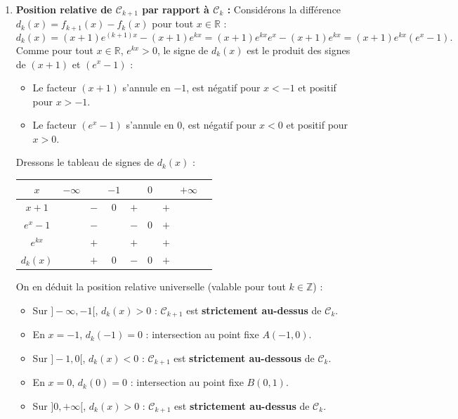 \documentclass[11pt,a4paper]{article}
\newcommand{\Z}{\mathbb{Z}}
\newcommand{\R}{\mathbb{R}}
\begin{document}
\begin{correctionbox}[Exercice 8]
\begin{enumerate}[label=\textbf{\arabic*.}]
    \item \textbf{Position relative de $\mathcal{C}_{k+1}$ par rapport à $\mathcal{C}_k$ :}
    Considérons la différence $d_k(x) = f_{k+1}(x) - f_k(x)$ pour tout $x \in \R$ :
    \[
    d_k(x) = (x+1)e^{(k+1)x} - (x+1)e^{kx} = (x+1)e^{kx}e^x - (x+1)e^{kx} = (x+1)e^{kx}(e^x - 1).
    \]
    Comme pour tout $x \in \R$, $e^{kx} > 0$, le signe de $d_k(x)$ est le produit des signes de $(x+1)$ et $(e^x - 1)$ :
    \begin{itemize}
        \item Le facteur $(x+1)$ s'annule en $-1$, est négatif pour $x < -1$ et positif pour $x > -1$.
        \item Le facteur $(e^x - 1)$ s'annule en $0$, est négatif pour $x < 0$ et positif pour $x > 0$.
    \end{itemize}
    Dressons le tableau de signes de $d_k(x)$ :
    \begin{center}
    \begin{tabular}{|c|lccccccr|}
    \hline
    $x$ & $-\infty$ & & $-1$ & & $0$ & & $+\infty$ \\
    \hline
    $x + 1$ & & $-$ & $0$ & $+$ & \vline & $+$ & \\
    \hline
    $e^x - 1$ & & $-$ & \vline & $-$ & $0$ & $+$ & \\
    \hline
    $e^{kx}$ & & $+$ & \vline & $+$ & \vline & $+$ & \\
    \hline
    $d_k(x)$ & & $+$ & $0$ & $-$ & $0$ & $+$ & \\
    \hline
    \end{tabular}
    \end{center}
    On en déduit la position relative universelle (valable pour tout $k \in \Z$) :
    \begin{itemize}
        \item Sur $]-\infty, -1[$, $d_k(x) > 0$ : $\mathcal{C}_{k+1}$ est \textbf{strictement au-dessus} de $\mathcal{C}_k$.
        \item En $x = -1$, $d_k(-1) = 0$ : intersection au point fixe $A(-1, 0)$.
        \item Sur $]-1, 0[$, $d_k(x) < 0$ : $\mathcal{C}_{k+1}$ est \textbf{strictement au-dessous} de $\mathcal{C}_k$.
        \item En $x = 0$, $d_k(0) = 0$ : intersection au point fixe $B(0, 1)$.
        \item Sur $]0, +\infty[$, $d_k(x) > 0$ : $\mathcal{C}_{k+1}$ est \textbf{strictement au-dessus} de $\mathcal{C}_k$.
    \end{itemize}


\end{enumerate}
\end{correctionbox}
\end{document}
